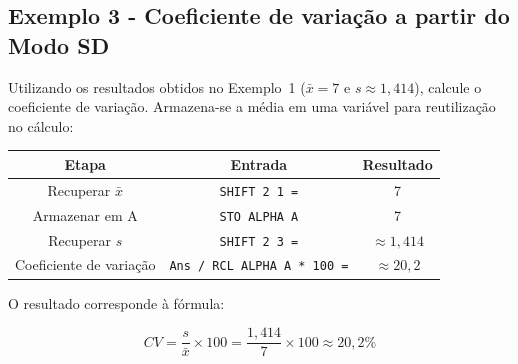 \subsection*{Exemplo 3 - Coeficiente de variação a partir do Modo SD}

Utilizando os resultados obtidos no Exemplo~1 ($\bar{x} = 7$ e $s \approx 1{,}414$), calcule o coeficiente de variação. Armazena-se a média em uma variável para reutilização no cálculo:

\begin{table}[H]
    \centering
    \begin{tabular}{|c|c|c|}
        \hline
        \textbf{Etapa} & \textbf{Entrada} & \textbf{Resultado} \\ \hline
        Recuperar $\bar{x}$ & \texttt{SHIFT 2 1 =} & 7 \\
        Armazenar em A & \texttt{STO ALPHA A} & 7 \\
        Recuperar $s$ & \texttt{SHIFT 2 3 =} & $\approx 1{,}414$ \\
        Coeficiente de variação & \texttt{Ans / RCL ALPHA A * 100 =}  & $\approx 20{,}2$ \\ \hline
    \end{tabular}
\end{table}

O resultado corresponde à fórmula:

\[
    CV = \frac{s}{\bar{x}} \times 100 = \frac{1{,}414}{7} \times 100 \approx 20{,}2\%
\]

